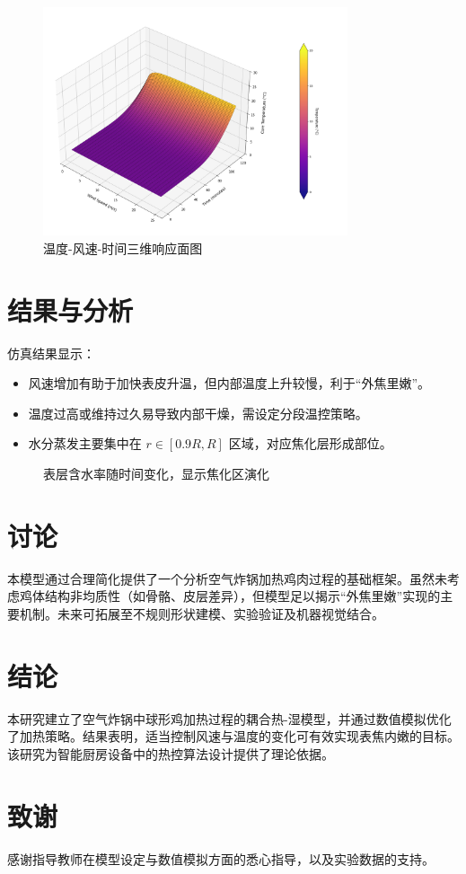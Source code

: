 \documentclass[12pt]{article}
\begin{document}
\begin{figure}[htbp]
\centering
\includegraphics[width=0.8\textwidth]{3d.png}
\caption{温度-风速-时间三维响应面图}
\end{figure}

\section{结果与分析}
仿真结果显示：
\begin{itemize}
\item 风速增加有助于加快表皮升温，但内部温度上升较慢，利于“外焦里嫩”。
\item 温度过高或维持过久易导致内部干燥，需设定分段温控策略。
\item 水分蒸发主要集中在 $r \in [0.9R, R]$ 区域，对应焦化层形成部位。
\end{itemize}

\begin{figure}[htbp]
\centering
\caption{表层含水率随时间变化，显示焦化区演化}
\end{figure}

\section{讨论}
本模型通过合理简化提供了一个分析空气炸锅加热鸡肉过程的基础框架。虽然未考虑鸡体结构非均质性（如骨骼、皮层差异），但模型足以揭示“外焦里嫩”实现的主要机制。未来可拓展至不规则形状建模、实验验证及机器视觉结合。

\section{结论}
本研究建立了空气炸锅中球形鸡加热过程的耦合热-湿模型，并通过数值模拟优化了加热策略。结果表明，适当控制风速与温度的变化可有效实现表焦内嫩的目标。该研究为智能厨房设备中的热控算法设计提供了理论依据。

\section*{致谢}
感谢指导教师在模型设定与数值模拟方面的悉心指导，以及实验数据的支持。



\end{document}
